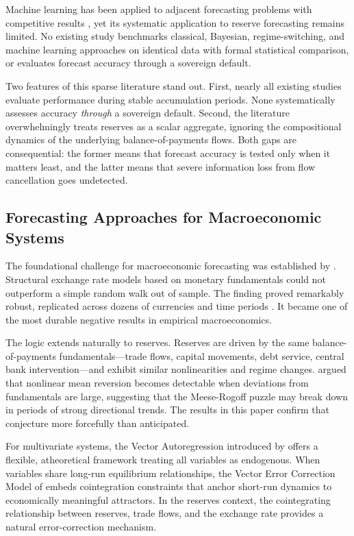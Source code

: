\documentclass[12pt,a4paper]{article}
\begin{document}
Machine learning has been applied to adjacent forecasting problems with competitive results \citep{MedeirosVasconcelosVeigaZilberman2021,RichardsonMulderVehbi2021}, yet its systematic application to reserve forecasting remains limited. No existing study benchmarks classical, Bayesian, regime-switching, and machine learning approaches on identical data with formal statistical comparison, or evaluates forecast accuracy through a sovereign default.

Two features of this sparse literature stand out. First, nearly all existing studies evaluate performance during stable accumulation periods. None systematically assesses accuracy \textit{through} a sovereign default. Second, the literature overwhelmingly treats reserves as a scalar aggregate, ignoring the compositional dynamics of the underlying balance-of-payments flows. Both gaps are consequential: the former means that forecast accuracy is tested only when it matters least, and the latter means that severe information loss from flow cancellation goes undetected.

\subsection{Forecasting Approaches for Macroeconomic Systems}

The foundational challenge for macroeconomic forecasting was established by \cite{MeeseRogoff1983}. Structural exchange rate models based on monetary fundamentals could not outperform a simple random walk out of sample. The finding proved remarkably robust, replicated across dozens of currencies and time periods \citep{Rossi2013,CheungChinnPascual2005}. It became one of the most durable negative results in empirical macroeconomics.

The logic extends naturally to reserves. Reserves are driven by the same balance-of-payments fundamentals---trade flows, capital movements, debt service, central bank intervention---and exhibit similar nonlinearities and regime changes. \cite{TaylorPeelSarno2001} argued that nonlinear mean reversion becomes detectable when deviations from fundamentals are large, suggesting that the Meese-Rogoff puzzle may break down in periods of strong directional trends. The results in this paper confirm that conjecture more forcefully than anticipated.

For multivariate systems, the Vector Autoregression introduced by \cite{Sims1980} offers a flexible, atheoretical framework treating all variables as endogenous. When variables share long-run equilibrium relationships, the Vector Error Correction Model of \cite{Johansen1988,Johansen1991} embeds cointegration constraints that anchor short-run dynamics to economically meaningful attractors. In the reserves context, the cointegrating relationship between reserves, trade flows, and the exchange rate provides a natural error-correction mechanism.
\end{document}
